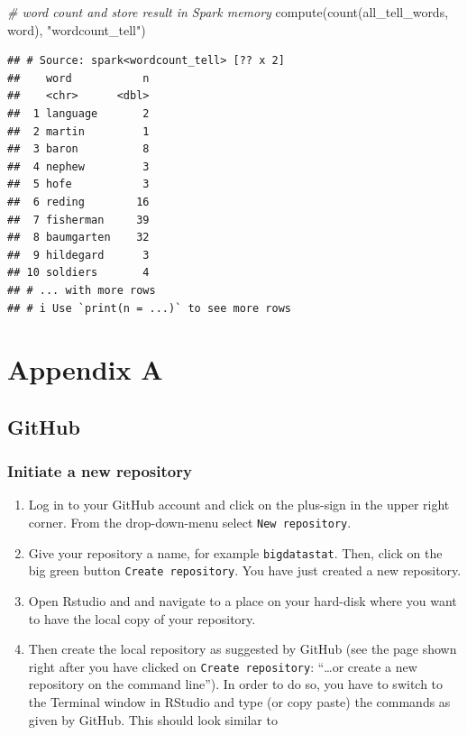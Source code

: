 \documentclass[
  12pt,
]{style/krantz}
\newenvironment{Shaded}{\begin{snugshade}}{\end{snugshade}}
\newcommand{\CommentTok}[1]{\textcolor[rgb]{0.56,0.35,0.01}{\textit{#1}}}
\newcommand{\FunctionTok}[1]{\textcolor[rgb]{0.00,0.00,0.00}{#1}}
\newcommand{\NormalTok}[1]{#1}
\newcommand{\StringTok}[1]{\textcolor[rgb]{0.31,0.60,0.02}{#1}}
\providecommand{\tightlist}{%
  \setlength{\itemsep}{0pt}\setlength{\parskip}{0pt}}
\begin{document}
\begin{Shaded}
\begin{Highlighting}[]
\CommentTok{\# word count and store result in Spark memory}
\FunctionTok{compute}\NormalTok{(}\FunctionTok{count}\NormalTok{(all\_tell\_words, word), }\StringTok{"wordcount\_tell"}\NormalTok{)}
\end{Highlighting}
\end{Shaded}

\begin{verbatim}
## # Source: spark<wordcount_tell> [?? x 2]
##    word           n
##    <chr>      <dbl>
##  1 language       2
##  2 martin         1
##  3 baron          8
##  4 nephew         3
##  5 hofe           3
##  6 reding        16
##  7 fisherman     39
##  8 baumgarten    32
##  9 hildegard      3
## 10 soldiers       4
## # ... with more rows
## # i Use `print(n = ...)` to see more rows
\end{verbatim}

\backmatter

\hypertarget{appendix-appendix}{%
\appendix {}}


\hypertarget{appendix-a}{%
\chapter{Appendix A}\label{appendix-a}}

\hypertarget{github}{%
\section{GitHub}\label{github}}

\hypertarget{initiate-a-new-repository}{%
\subsection{Initiate a new repository}\label{initiate-a-new-repository}}

\begin{enumerate}
\def\labelenumi{\arabic{enumi}.}
\tightlist
\item
  Log in to your GitHub account and click on the plus-sign in the upper right corner. From the drop-down-menu select \texttt{New\ repository}.
\item
  Give your repository a name, for example \texttt{bigdatastat}. Then, click on the big green button \texttt{Create\ repository}. You have just created a new repository.
\item
  Open Rstudio and and navigate to a place on your hard-disk where you want to have the local copy of your repository.
\item
  Then create the local repository as suggested by GitHub (see the page shown right after you have clicked on \texttt{Create\ repository}: ``\ldots or create a new repository on the command line''). In order to do so, you have to switch to the Terminal window in RStudio and type (or copy paste) the commands as given by GitHub. This should look similar to
\end{enumerate}
\end{document}
